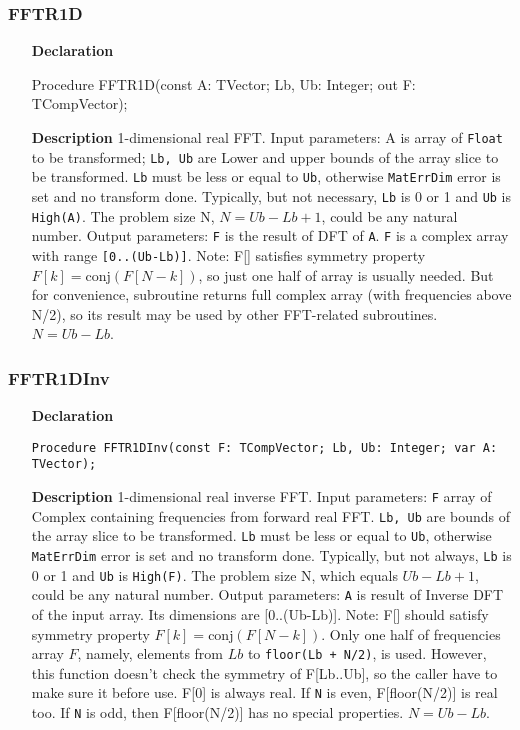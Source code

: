 \documentclass[12pt,a4paper,oneside]{report}
\newcommand{\declarationitem}[1]{\textbf{#1}}
\newcommand{\descriptiontitle}[1]{\textbf{#1}}
\newcommand{\code}[1]{\texttt{#1}}
\begin{document}
\subsubsection{FFTR1D}
\label{fftr1d}
\begin{itemize}
	\item[\declarationitem{Declaration}\hfill]
	\begin{flushleft}
	Procedure FFTR1D(const A: TVector; Lb, Ub: Integer; out F: TCompVector);	
	\end{flushleft}
	\item[\descriptiontitle{Description}]
	1-dimensional real FFT.	Input parameters: A is array of \code{Float} to be transformed;
	\code{Lb, Ub} are Lower and upper bounds of the array slice to be transformed.
	\code{Lb} must be less or equal to \code{Ub}, otherwise \code{MatErrDim} error is set and no transform done.
	Typically, but not necessary, \code{Lb} is 0 or 1 and \code{Ub} is \code{High(A)}.
	The problem size N,  $N=Ub-Lb+1$, could be any natural number.
	Output parameters: \code{F} is the result of DFT of \code{A}. \code{F} is a complex array with range \code{[0..(Ub-Lb)]}.
	Note:
	F[] satisfies symmetry property $F[k] = \mathrm{conj}(F[N-k])$, so just one half of
	array is usually needed. But for convenience, subroutine returns full complex
	array (with frequencies above N/2), so its result may be  used  by other
	FFT-related subroutines. $N = Ub-Lb$.
\end{itemize}	
\subsubsection{FFTR1DInv}
\label{fftr1dinv}
\begin{itemize}
	\item[\declarationitem{Declaration}\hfill]
	\begin{flushleft}
		\code{Procedure FFTR1DInv(const F: TCompVector; Lb, Ub: Integer; var A: TVector);}
	\end{flushleft}
	\item[\descriptiontitle{Description}]
	1-dimensional real inverse FFT. Input parameters: \code{F} array of Complex containing frequencies from forward real FFT. \code{Lb, Ub} are bounds of the array slice to be transformed. \code{Lb} must be less or equal to \code{Ub}, otherwise \code{MatErrDim} error is set and no transform done. Typically, but not always, \code{Lb} is 0 or 1 and \code{Ub} is \code{High(F)}.	The problem size N, which equals $Ub-Lb+1$, could be any natural number.
	Output parameters: \code{A} is result of Inverse DFT of the input array. Its dimensions are [0..(Ub-Lb)]. Note:	F[] should satisfy symmetry property $F[k] = \mathrm{conj}(F[N-k])$. Only  one half of frequencies array $F$, namely, elements from $Lb$ to \code{floor(Lb + N/2)}, is used. However, this function doesn't check the symmetry of F[Lb..Ub], so the caller have to
	make sure it before use. F[0] is always real. If \code{N} is even, F[floor(N/2)] is
	real too. If \code{N} is odd, then F[floor(N/2)] has no special properties. $N = Ub-Lb$.
\end{itemize}	
\end{document}
